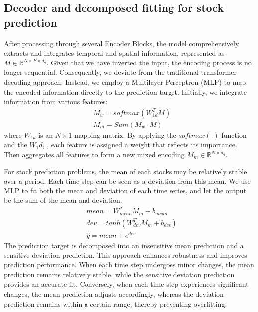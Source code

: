 \subsection{Decoder and decomposed fitting for stock prediction}
After processing through several Encoder Blocks, the model comprehensively extracts and integrates temporal and spatial information, represented as $M \in \mathbb{R}^{N \times F \times d_g}$. Given that we have inverted the input, the encoding process is no longer sequential. Consequently, we deviate from the traditional transformer decoding approach. Instead, we employ a Multilayer Perceptron (MLP) to map the encoded information directly to the prediction target. Initially, we integrate information from various features:
\begin{equation}
    \begin{split}
        &M_w = softmax(W_{1d}^TM)\\
        &M_m = Sum(M_w\cdot M)
    \end{split}
\end{equation}
where $W_{1d}$ is an $N \times 1$ mapping matrix. By applying the $softmax(\cdot)$ function and the $W_1d$, , each feature is assigned a weight that reflects its importance. Then aggregates all features to form a new mixed encoding $M_m \in \mathbb{R}^{N \times d_g}$.

For stock prediction problems, the mean of each stocks may be relatively stable over a period. Each time step can be seen as a deviation from this mean. We use  MLP to fit both the mean and deviation of each time series, and let the output be the sum of the mean and deviation.
\begin{equation}
    \begin{split}
        &mean = W_{mean}^TM_m+b_{mean}\\
        &dev = tanh(W_{dev}^TM_m+b_{dev})\\
        &\hat{y} = mean + e^{dev}
    \end{split}
\end{equation}
The prediction target is decomposed into an insensitive mean prediction and a sensitive deviation prediction. This approach enhances robustness and improves prediction performance. When each time step undergoes minor changes, the mean prediction remains relatively stable, while the sensitive deviation prediction provides an accurate fit. Conversely, when each time step experiences significant changes, the mean prediction adjusts accordingly, whereas the deviation prediction remains within a certain range, thereby preventing overfitting.

